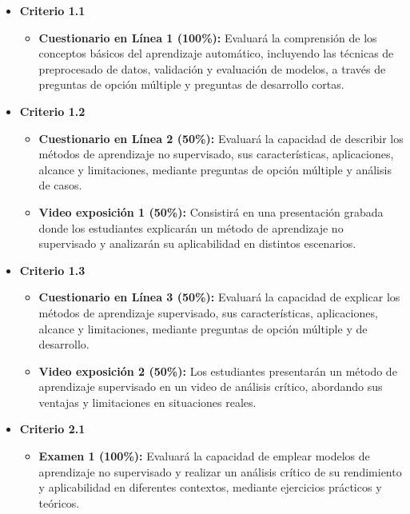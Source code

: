 \documentclass[a4,11pt]{aleph-notas}
\begin{document}
\begin{itemize}[leftmargin=*]
    \item \textbf{Criterio 1.1}
        \begin{itemize}[leftmargin=*]
            \item \textbf{Cuestionario en Línea 1 (100\%):} Evaluará la comprensión de los conceptos básicos del aprendizaje automático, incluyendo las técnicas de preprocesado de datos, validación y evaluación de modelos, a través de preguntas de opción múltiple y preguntas de desarrollo cortas.
        \end{itemize}
    \item \textbf{Criterio 1.2}
        \begin{itemize}[leftmargin=*]
            \item \textbf{Cuestionario en Línea 2 (50\%):} Evaluará la capacidad de describir los métodos de aprendizaje no supervisado, sus características, aplicaciones, alcance y limitaciones, mediante preguntas de opción múltiple y análisis de casos.
            \item \textbf{Video exposición 1 (50\%):} Consistirá en una presentación grabada donde los estudiantes explicarán un método de aprendizaje no supervisado y analizarán su aplicabilidad en distintos escenarios.
        \end{itemize}
    \item \textbf{Criterio 1.3}
        \begin{itemize}[leftmargin=*]
            \item \textbf{Cuestionario en Línea 3 (50\%):} Evaluará la capacidad de explicar los métodos de aprendizaje supervisado, sus características, aplicaciones, alcance y limitaciones, mediante preguntas de opción múltiple y de desarrollo.
            \item \textbf{Video exposición 2 (50\%):} Los estudiantes presentarán un método de aprendizaje supervisado en un video de análisis crítico, abordando sus ventajas y limitaciones en situaciones reales.
        \end{itemize}
    \item \textbf{Criterio 2.1}
        \begin{itemize}[leftmargin=*]
            \item \textbf{Examen 1 (100\%):} Evaluará la capacidad de emplear modelos de aprendizaje no supervisado y realizar un análisis crítico de su rendimiento y aplicabilidad en diferentes contextos, mediante ejercicios prácticos y teóricos.
        \end{itemize}

\end{itemize}
\end{document}
